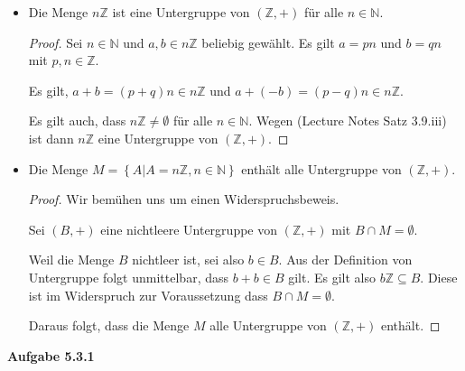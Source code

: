 \documentclass[12pt]{extarticle}
\begin{document}
\begin{itemize}
  \item Die Menge \(n\mathbb{Z}\) ist eine Untergruppe von $(\mathbb{Z},
    +)$ für alle \(n \in \mathbb{N}\).

    \begin{proof}
      Sei \(n \in \mathbb{N}\) und \(a, b \in n\mathbb{Z}\) beliebig
      gewählt.  Es gilt \(a = pn\) und \(b = qn\) mit
      \(p, n \in \mathbb{Z}\).

      Es gilt, \(a+b=(p+q)n \in n\mathbb{Z}\) und
      \(a+(-b)=(p-q)n \in n\mathbb{Z}\).

      Es gilt auch, dass \(n\mathbb{Z} \neq \emptyset\) für alle
      \(n \in \mathbb{N}\). Wegen (Lecture Notes Satz 3.9.iii) ist dann
      \(n\mathbb{Z}\) eine Untergruppe von \((\mathbb{Z}, +)\).
    \end{proof}
  \item Die Menge
    \(M=\left\{A|A = n\mathbb{Z}, n \in \mathbb{N} \right\}\) enthält alle
    Untergruppe von \((\mathbb{Z}, +)\).

    \begin{proof}
      Wir bemühen uns um einen Widerspruchsbeweis.

      Sei \((B, +)\) eine nichtleere Untergruppe von \((\mathbb{Z}, +)\) mit
      \(B \cap M = \emptyset\).

      Weil die Menge \(B\) nichtleer ist, sei also \(b \in B\).  Aus der
      Definition von Untergruppe folgt unmittelbar, dass \(b + b \in B\)
      gilt.  Es gilt also \(b\mathbb{Z} \subseteq B\).  Diese ist im
      Widerspruch zur Voraussetzung dass \(B \cap M = \emptyset\).

      Daraus folgt, dass die Menge \(M\) alle Untergruppe von
      \((\mathbb{Z}, +)\) enthält.
    \end{proof}
  \end{itemize}

  \textbf{Aufgabe 5.3.1}
\end{document}
